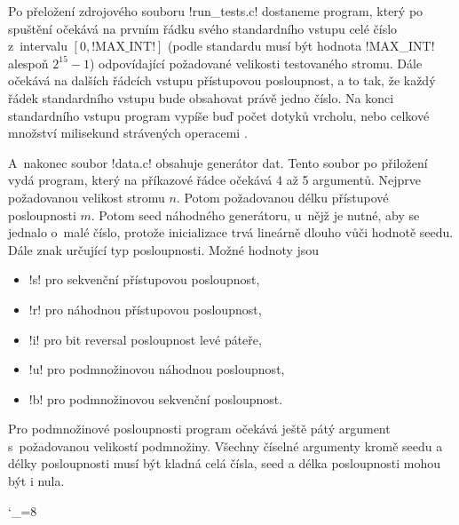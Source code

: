 Po přeložení zdrojového souboru !run_tests.c! dostaneme program, který po
spuštění očekává na prvním řádku svého standardního vstupu celé číslo
z~intervalu $[0, \text{!MAX_INT!}]$ (podle standardu musí být hodnota !MAX_INT!
alespoň $2^{15}-1$) odpovídající požadované velikosti testovaného stromu. Dále
očekává na dalších řádcích vstupu přístupovou posloupnost, a to tak, že každý
řádek standardního vstupu bude obsahovat právě jedno číslo. Na konci
standardního vstupu program vypíše buď počet dotyků vrcholu, nebo celkové
množství milisekund strávených operacemi .

A~nakonec soubor !data.c! obsahuje generátor dat. Tento soubor po přiložení vydá program, který na příkazové řádce očekává 4 až 5 argumentů. Nejprve požadovanou velikost stromu $n$. Potom požadovanou délku přístupové posloupnosti $m$. Potom seed náhodného generátoru, u~nějž je nutné, aby se jednalo o~malé číslo, protože inicializace trvá lineárně dlouho vůči hodnotě seedu. Dále znak určující typ posloupnosti. Možné hodnoty jsou

\begin{itemize}
\item !s! pro sekvenční přístupovou posloupnost,
\item !r! pro náhodnou přístupovou posloupnost,
\item !i! pro bit reversal posloupnost levé páteře,
\item !u! pro podmnožinovou náhodnou posloupnost,
\item !b! pro podmnožinovou sekvenční posloupnost.
\end{itemize}

Pro podmnožinové posloupnosti program očekává ještě pátý argument s~požadovanou velikostí podmnožiny. Všechny číselné argumenty kromě seedu a délky posloupnosti musí být kladná celá čísla, seed a délka posloupnosti mohou být i nula.

\catcode`_=8
